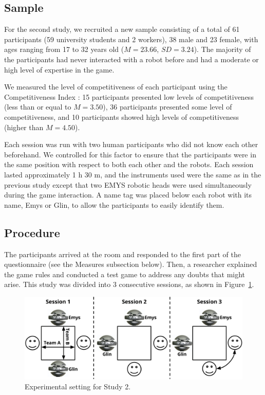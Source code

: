 \subsection{Sample}
For the second study, we recruited a new sample consisting of a total of 61 participants (59 university students and 2 workers), 38 male and 23 female, with ages ranging from 17 to 32 years old ($M=23.66$, $SD=3.24$). The majority of the participants had never interacted with a robot before and had a moderate or high level of expertise in the game.

We measured the level of competitiveness of each participant using the Competitiveness Index \cite{smither1992nature}: 15 participants presented low levels of competitiveness (less than or equal to $M=3.50$), 36 participants presented some level of competitiveness, and 10 participants showed high levels of competitiveness (higher than $M=4.50$).


Each session was run with two human participants who did not know each other beforehand. We controlled for this factor to ensure that the participants were in the same position with respect to both each other and the robots.
Each session lasted approximately 1 h 30 m, and the instruments used were the same as in the previous study except that two EMYS robotic heads were used simultaneously during the game interaction. A name tag was placed below each robot with its name, Emys or Glin, to allow the participants to easily identify them.


\subsection{Procedure}
The participants arrived at the room and responded to the first part of the questionnaire (see the Measures subsection below). Then, a researcher explained the game rules and conducted a test game to address any doubts that might arise. 
This study was divided into 3 consecutive sessions, as shown in Figure~\ref{3sessions-setup}.



\begin{figure}[ht]
\centering
\includegraphics[width=0.9\columnwidth]{images/membership/2EmysSetUp}
\caption{Experimental setting for Study 2.}
\label{3sessions-setup}
\end{figure}


